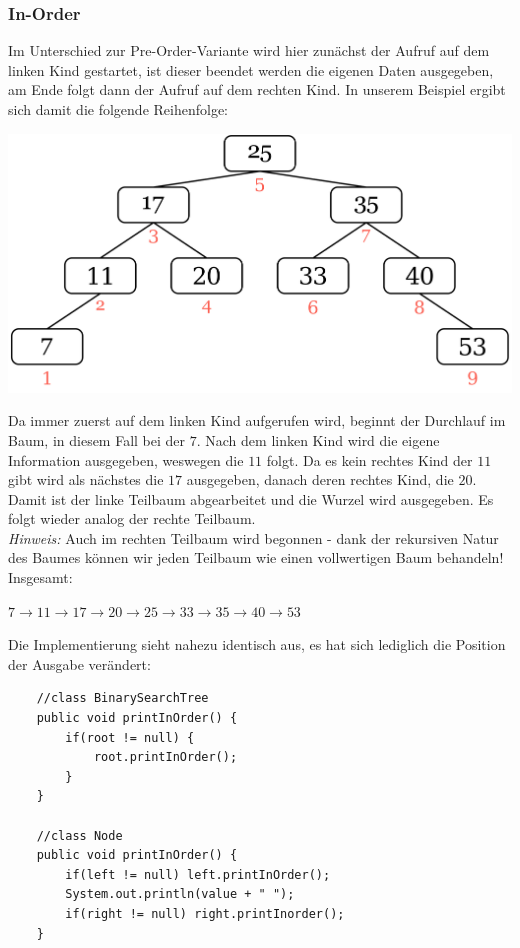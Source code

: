 \documentclass{article}
\begin{document}
\subsubsection{In-Order}
Im Unterschied zur Pre-Order-Variante wird hier zunächst der Aufruf auf dem linken Kind gestartet, ist dieser beendet werden die eigenen Daten ausgegeben, am Ende folgt dann der Aufruf auf dem rechten Kind. In unserem Beispiel ergibt sich damit die folgende Reihenfolge:
\begin{center}
    \includegraphics[scale=0.2]{../../media/inorder.png}
\end{center}
Da immer zuerst auf dem linken Kind aufgerufen wird, beginnt der Durchlauf  im Baum, in diesem Fall bei der $7$. Nach dem linken Kind wird die eigene Information ausgegeben, weswegen die $11$ folgt. Da es kein rechtes Kind der $11$ gibt wird als nächstes die $17$ ausgegeben, danach deren rechtes Kind, die $20$. Damit ist der linke Teilbaum abgearbeitet und die Wurzel wird ausgegeben. Es folgt wieder analog der rechte Teilbaum. \\
\textit{Hinweis:} Auch im rechten Teilbaum wird  begonnen - dank der rekursiven Natur des Baumes können wir jeden Teilbaum wie einen vollwertigen Baum behandeln! \\
Insgesamt:
\begin{center}
    $7 \rightarrow 11 \rightarrow 17 \rightarrow 20 \rightarrow 25 \rightarrow 33 \rightarrow 35 \rightarrow 40 \rightarrow 53$
\end{center}
Die Implementierung sieht nahezu identisch aus, es hat sich lediglich die Position der Ausgabe verändert: 
\begin{verbatim}
    //class BinarySearchTree
    public void printInOrder() {
        if(root != null) {
            root.printInOrder();
        }
    }

    //class Node 
    public void printInOrder() {
        if(left != null) left.printInOrder();
        System.out.println(value + " ");
        if(right != null) right.printInorder();
    }
\end{verbatim}
\end{document}
